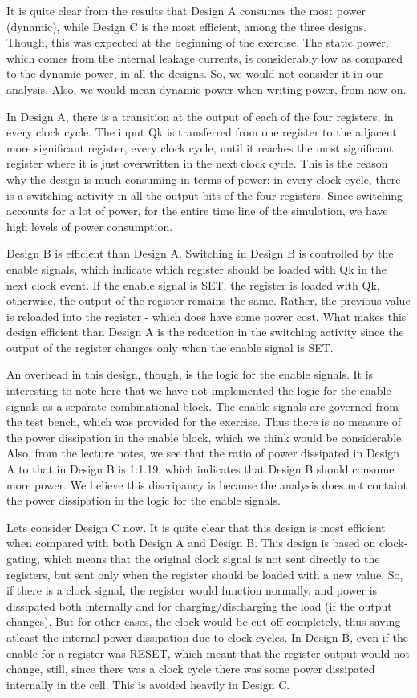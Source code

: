 \documentclass[11pt,a4paper]{article}
\begin{document}
It is quite clear from the results that Design A consumes the most power (dynamic), while Design C is the most efficient, among the three designs. Though, this was expected at the beginning of the exercise. The static power, which comes from the internal leakage currents, is considerably low as compared to the dynamic power, in all the designs. So, we would not consider it in our analysis. Also, we would mean dynamic power when writing power, from now on.

In Design A, there is a transition at the output of each of the four registers, in every clock cycle. The input Qk is transferred from one register to the adjacent more significant register, every clock cycle, until it reaches the most significant register where it is just overwritten in the next clock cycle. This is the reason why the design is much consuming in terms of power: in every clock cycle, there is a switching activity in all the output bits of the four registers. Since switching accounts for a lot of power, for the entire time line of the simulation, we have high levels of power consumption. 

Design B is efficient than Design A. Switching in Design B is controlled by the enable signals, which indicate which register should be loaded with Qk in the next clock event. If the enable signal is SET, the register is loaded with Qk, otherwise, the output of the register remains the same. Rather, the previous value is reloaded into the register - which does have some power cost. What makes this design efficient than Design A is the reduction in the switching activity since the output of the register changes only when the enable signal is SET.

An overhead in this design, though, is the logic for the enable signals. It is interesting to note here that we have not implemented the logic for the enable signals as a separate combinational block. The enable signals are governed from the test bench, which was provided for the exercise. Thus there is no measure of the power dissipation in the enable block, which we think would be considerable. Also, from the lecture notes, we see that the ratio of power dissipated in Design A to that in Design B is 1:1.19, which indicates that Design B should consume more power. We believe this discripancy is because the analysis does not containt the power dissipation in the logic for the enable signals.

Lets consider Design C now. It is quite clear that this design is most efficient when compared with both Design A and Design B. This design is based on clock-gating, which means that the original clock signal is not sent directly to the registers, but sent only when the register should be loaded with a new value. So, if there is a clock signal, the register would function normally, and power is dissipated both internally and for charging/discharging the load (if the output changes). But for other cases, the clock would be cut off completely, thus saving atleast the internal power dissipation due to clock cycles. In Design B, even if the enable for a register was RESET, which meant that the register output would not change, still, since there was a clock cycle there was some power dissipated internally in the cell. This is avoided heavily in Design C.
\end{document}
